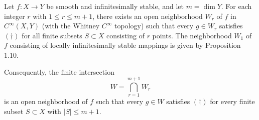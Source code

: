 Let $f: X \to Y$ be smooth and infinitesimally stable, and let $m = \dim Y$. For each integer $r$ with $1 \leq r \leq m+1$, there exists an open neighborhood $W_r$ of $f$ in $C^\infty(X, Y)$ (with the Whitney $C^\infty$ topology) such that every $g \in W_r$ satisfies $(\dagger)$ for all finite subsets $S \subset X$ consisting of $r$ points. The neighborhood $W_1$ of $f$ consisting of locally infinitesimally stable mappings is given by Proposition 1.10.

Consequently, the finite intersection
$$
W = \bigcap_{r=1}^{m+1} W_r
$$
is an open neighborhood of $f$ such that every $g \in W$ satisfies $(\dagger)$ for every finite subset $S \subset X$ with $|S| \leq m+1$.
